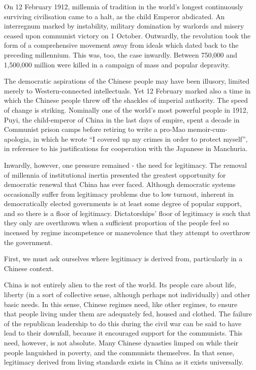 \documentclass[11pt,a4paper]{report}
\begin{document}
\begin{multicols}{2}
	
On 12 February 1912, millennia of tradition in the world’s longest continuously surviving civilisation came to a halt, as the child Emperor abdicated. An interregnum marked by instability, military domination by warlords and misery ceased upon communist victory on 1 October. Outwardly, the revolution took the form of a comprehensive movement away from ideals which dated back to the preceding millennium. This was, too, the case inwardly. Between 750,000 and 1,500,000 million were killed in a campaign of mass and popular depravity.

The democratic aspirations of the Chinese people may have been illusory, limited merely to Western-connected intellectuals. Yet 12 February marked also a time in which the Chinese people threw off the shackles of imperial authority. The speed of change is striking. Nominally one of the world’s most powerful people in 1912, Puyi, the child-emperor of China in the last days of empire, spent a decade in Communist prison camps before retiring to write a pro-Mao memoir-cum-apologia, in which he wrote ``I covered up my crimes in order to protect myself”, in reference to his justifications for cooperation with the Japanese in Manchuria.

Inwardly, however, one pressure remained - the need for legitimacy. The removal of millennia of institutional inertia presented the greatest opportunity for democratic renewal that China has ever faced. Although democratic systems occasionally suffer from legitimacy problems due to low turnout, inherent in democratically elected governments is at least some degree of popular support, and so there is a floor of legitimacy. Dictatorships' floor of legitimacy is such that they only are overthrown when a sufficient proportion of the people feel so incensed by regime incompetence or manevolence that they attempt to overthrow the government.

First, we must ask ourselves where legitimacy is derived from, particularly in a Chinese context.

China is not entirely alien to the rest of the world. Its people care about life, liberty (in a sort of collective sense, although perhaps not individually) and other basic needs. In this sense, Chinese regimes need, like other regimes, to ensure that people living under them are adequately fed, housed and clothed. The failure of the republican leadership to do this during the civil war can be said to have lead to their downfall, because it encouraged support for the communists. This need, however, is not absolute. Many Chinese dynasties limped on while their people languished in poverty, and the communists themselves. In that sense, legitimacy derived from living standards exists in China as it exists universally.


\end{multicols}
\end{document}
